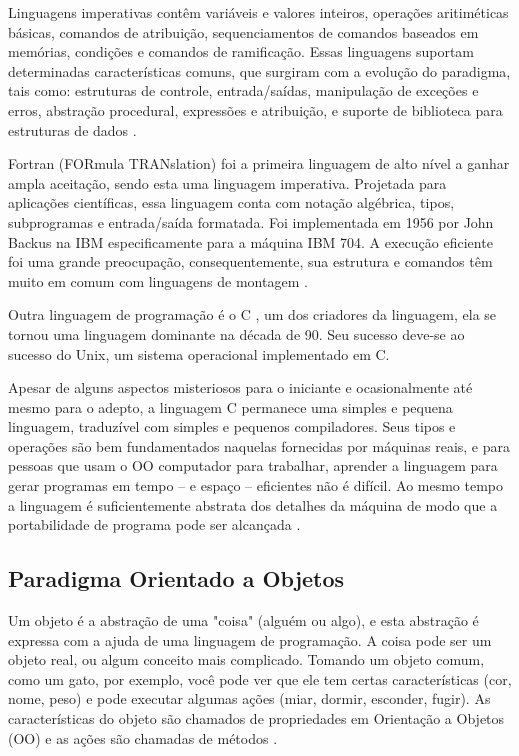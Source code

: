 Linguagens imperativas contêm variáveis e valores inteiros, operações aritiméticas básicas, comandos de atribuição, sequenciamentos de comandos baseados em memórias, condições e comandos de ramificação. Essas linguagens suportam determinadas características comuns, que surgiram com a evolução do paradigma, tais como: estruturas de controle, entrada/saídas, manipulação de exceções e erros, abstração procedural, expressões e atribuição, e suporte de biblioteca para estruturas de dados \cite[pág.~278-279]{tucker2009}.

Fortran (FORmula TRANslation) foi a primeira linguagem de alto nível a ganhar ampla aceitação, sendo esta uma linguagem imperativa. Projetada para aplicações científicas, essa linguagem conta com notação algébrica, tipos, subprogramas e entrada/saída formatada. Foi implementada em 1956 por John Backus na IBM especificamente para a máquina IBM 704. A execução eficiente foi uma grande preocupação, consequentemente, sua estrutura e comandos têm muito em comum com linguagens de montagem \cite[pág.~458]{brookshear}.

Outra linguagem de programação é o C , um dos criadores da linguagem, ela se tornou uma linguagem dominante na década de 90. Seu sucesso deve-se ao sucesso do Unix, um sistema operacional implementado em C.

\begin{citacao}
Apesar de alguns aspectos misteriosos para o iniciante e ocasionalmente até mesmo para o adepto, a linguagem C permanece uma simples e pequena linguagem, traduzível com simples e pequenos compiladores. Seus tipos e operações são bem fundamentados naquelas fornecidas por máquinas reais, e para pessoas que usam o OO computador para trabalhar, aprender a linguagem para gerar programas em tempo – e espaço – eficientes não é difícil. Ao mesmo tempo a linguagem é suficientemente abstrata dos detalhes da máquina de modo que a portabilidade de programa pode ser alcançada \cite{ritchie1996}.
\end{citacao}

\subsection{Paradigma Orientado a Objetos}

Um objeto é a abstração de uma "coisa" (alguém ou algo), e esta abstração é expressa com a ajuda de uma linguagem de programação. A coisa pode ser um objeto real, ou algum conceito mais complicado. Tomando um objeto comum, como um gato, por exemplo, você pode ver que ele tem certas características (cor, nome, peso) e pode executar algumas ações (miar, dormir, esconder, fugir). As características do objeto são chamados de propriedades em Orientação a Objetos (OO) e as ações são chamadas de métodos \cite[pág.~13]{stefanov2008}.

